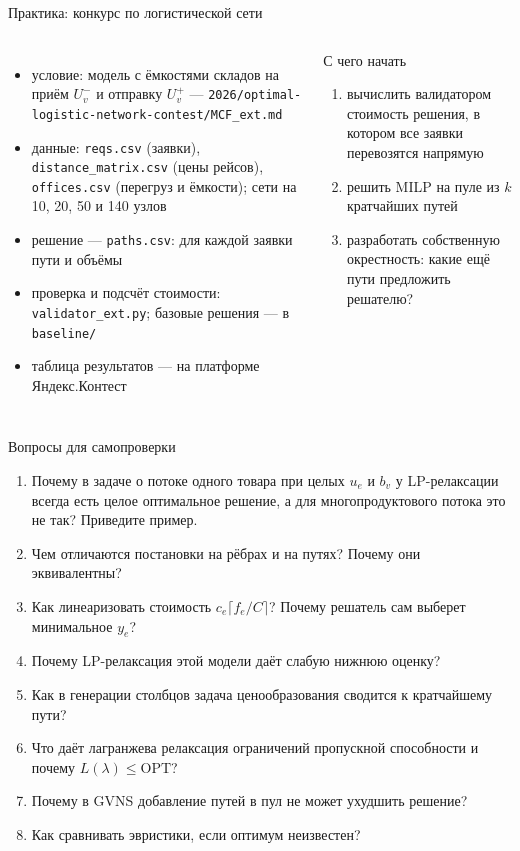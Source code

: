 \documentclass[aspectratio=169,10pt]{beamer}
\begin{document}
\begin{frame}{Практика: конкурс по логистической сети}
\begin{columns}[T]
\begin{itemize}\setlength{\itemsep}{4pt}
\item условие: модель с ёмкостями складов на приём $U^-_v$ и отправку $U^+_v$ --- \texttt{2026/optimal-logistic-network-contest/MCF\_ext.md}
\item данные: \texttt{reqs.csv} (заявки), \texttt{distance\_matrix.csv} (цены рейсов), \texttt{offices.csv} (перегруз и ёмкости); сети на 10, 20, 50 и 140 узлов
\item решение --- \texttt{paths.csv}: для каждой заявки пути и объёмы
\item проверка и подсчёт стоимости: \texttt{validator\_ext.py}; базовые решения --- в \texttt{baseline/}
\item таблица результатов --- на платформе Яндекс.Контест
\end{itemize}
\begin{block}{С чего начать}
\begin{enumerate}
\item вычислить валидатором стоимость решения, в котором все заявки перевозятся напрямую
\item решить MILP на пуле из $k$ кратчайших путей
\item разработать собственную окрестность: какие ещё пути предложить решателю?
\end{enumerate}
\end{block}
\end{columns}
\end{frame}

\begin{frame}{Вопросы для самопроверки}
\begin{enumerate}\setlength{\itemsep}{4pt}
\item Почему в задаче о потоке одного товара при целых $u_e$ и $b_v$ у LP-релаксации всегда есть целое оптимальное решение, а для многопродуктового потока это не так? Приведите пример.
\item Чем отличаются постановки на рёбрах и на путях? Почему они эквивалентны?
\item Как линеаризовать стоимость $c_e\lceil f_e/C\rceil$? Почему решатель сам выберет минимальное $y_e$?
\item Почему LP-релаксация этой модели даёт слабую нижнюю оценку?
\item Как в генерации столбцов задача ценообразования сводится к кратчайшему пути?
\item Что даёт лагранжева релаксация ограничений пропускной способности и почему $L(\lambda)\le\text{OPT}$?
\item Почему в GVNS добавление путей в пул не может ухудшить решение?
\item Как сравнивать эвристики, если оптимум неизвестен?
\end{enumerate}
\end{frame}
\end{document}

